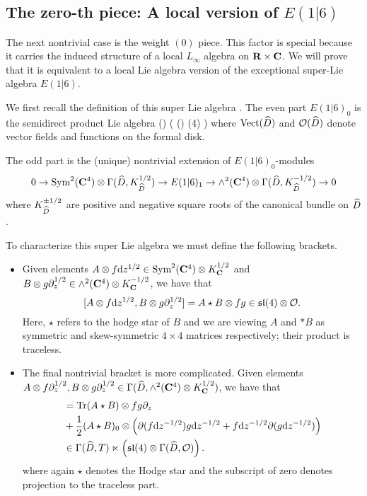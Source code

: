 \documentclass[../main.tex]{subfiles}
\begin{document}




\subsection{The zero-th piece: A local version of $E(1|6)$}
\parsec[] The next nontrivial case is the weight ${(0)}$ piece. This factor is special because it carries the induced structure of a local $L_\infty$ algebra on $\mathbf{R}\times \mathbf{C}$. We will prove that it is equivalent to a local Lie algebra version of the exceptional super-Lie algebra $E(1|6)$. 

We first recall the definition of this super Lie algebra \cite{KacBible}. 
The even part $E(1|6)_0$ is the semidirect product Lie algebra 
\beqn
\Vect() \ltimes \left( \cO() \otimes {}(4) \right )
\eeqn
where $\Vect(\Hat{D})$ and $\cO(\Hat{D})$ denote vector fields and functions on the formal disk.

The odd part is the (unique) nontrivial extension of $E(1|6)_0$-modules 
\[0\to \Sym^2 (\C^4)\otimes \Gamma(\Hat{D}, K^{1/2}_{\Hat{D}}) \to E(1|6)_1 \to \wedge^2 (\C^4) \otimes \Gamma(\Hat{D}, K^{-1/2}_{\Hat{D}}) \to 0 
\]
where $K^{\pm 1/2}_{\Hat{D}}$ are positive and negative square roots of the canonical bundle on $\Hat{D}$.

To characterize this super Lie algebra we must define the following brackets.
\begin{itemize}
\item Given elements $A \otimes f \mathrm{d} z^{1/2}\in \text{Sym}^2 (\mathbf{C}^4)\otimes K^{1/2}_{\mathbf{C}}$ and $B\otimes g \partial_z^{1/2}\in \wedge^2 (\mathbf{C}^4)\otimes K^{-1/2}_{\mathbf{C}}$, we have that
\[
[A \otimes f \mathrm{d} z^{1/2}, B\otimes g \partial_z^{1/2}] = A \star B \otimes fg \in \mathfrak{sl}(4)\otimes \mathcal{O}.
\]
Here, $\star$ refers to the hodge star of $B$ and we are viewing $A$ and $*B$ as symmetric and skew-symmetric $4\times 4$ matrices respectively; their product is traceless. 

\item The final nontrivial bracket is more complicated. 
Given elements $A \otimes f \partial_z^{1/2}, B\otimes g \partial_z^{1/2} \in \Gamma( \widehat D, \wedge^2 (\mathbf{C}^4) \otimes K^{1/2}_{\mathbf{C}})$, we have that 
\begin{align*}
[A\otimes f \d z^{-1/2} , B \otimes g \d z^{-1/2} ] & = \tr (A \star B) \otimes fg \del_z \\ & + \frac12 (A \star B)_0 \otimes \left (\del (f \d z^{-1/2} ) g \d z^{-1/2} + f \d z^{-1/2} \del (g \d z^{-1/2} ) \right ) \\
& \in \Gamma (\hat D, T) \ltimes \left (\mf {sl}(4) \otimes \Gamma (\hat D, \mc O) \right ) .
\end{align*}
where again $\star$ denotes the Hodge star and the subscript of zero denotes projection to the traceless part. 
\end{itemize}
\end{document}
